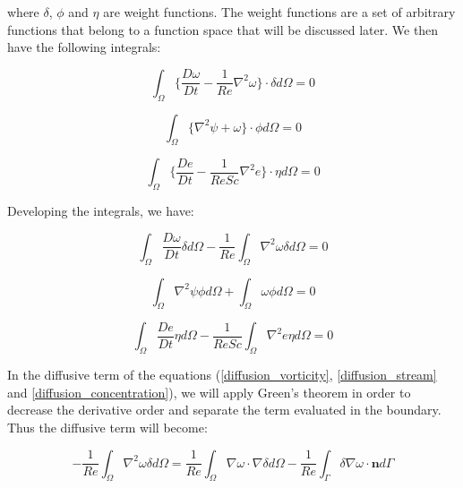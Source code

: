 \noindent
where $\delta$, $\phi$ and $\eta$ are weight functions.
The weight functions are a set of arbitrary functions 
that belong to a function space that will be discussed later. 
We then have the following integrals:

\begin{equation}
 \int_{\Omega} \Bigg\{ 
 \frac{D \omega}{D t}
 -
 \frac{1}{Re} \nabla^{2} \omega
\Bigg\} \cdot \delta d\Omega = 0
\end{equation}

\begin{equation}
 \int_{\Omega} \big\{ \nabla^2 \psi + \omega \big\} \cdot \phi d\Omega = 0
\end{equation}

\begin{equation}
 \int_{\Omega} \Bigg\{ 
 \frac{D e}{Dt}
 -
 \frac{1}{ReSc} \nabla^{2} e
 \Bigg\} \cdot \eta d\Omega = 0
\end{equation}



\noindent
Developing the integrals, we have:

\begin{equation} \label{diffusion_vorticity} 
   \int_{\Omega} \frac{D \omega}{Dt} \delta d\Omega 
 - \frac{1}{\textit{Re}} \int_{\Omega} \nabla^2 \omega \delta d\Omega
 = 0
\end{equation}

\begin{equation} \label{diffusion_stream}
   \int_{\Omega} \nabla^2 \psi \phi d\Omega
 + \int_{\Omega} \omega \phi d\Omega = 0
\end{equation}

\begin{equation} \label{diffusion_concentration} 
   \int_{\Omega} \frac{D e}{Dt} \eta d\Omega
 - \frac{1}{\textit{ReSc}} \int_{\Omega} \nabla^2 e \eta d\Omega 
 = 0
\end{equation}

\medskip
In the diffusive term of the equations (\ref{diffusion_vorticity}, \ref{diffusion_stream} and \ref{diffusion_concentration}),
we will apply Green's theorem in order to decrease 
the derivative order and separate the term evaluated in the boundary. 
Thus the diffusive term will become:

\begin{equation} \label{diffusion2_vorticity} 
 - \frac{1}{\textit{Re}} \int_{\Omega} \nabla^2 \omega \delta d\Omega
 = \frac{1}{\textit{Re}} \int_{\Omega} \nabla \omega \cdot \nabla \delta d\Omega
 - \frac{1}{\textit{Re}} \int_{\Gamma} \delta \nabla \omega \cdot \textbf{n} d\Gamma
\end{equation}

